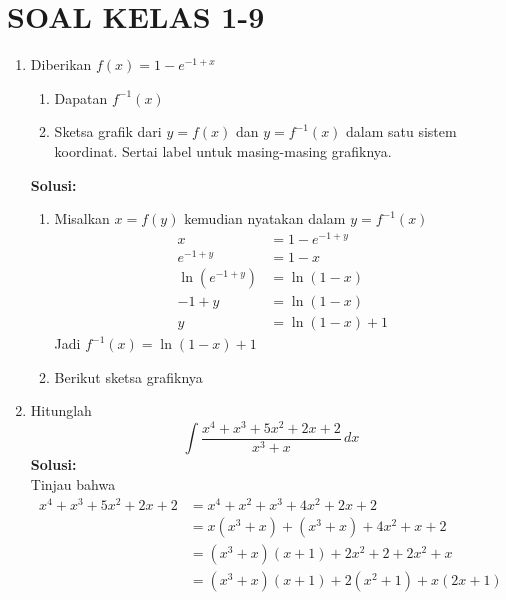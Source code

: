 \documentclass{article}
\begin{document}
\section*{SOAL KELAS 1-9}
\begin{enumerate}
	\item Diberikan $f(x)=1-e^{-1+x}$
	\begin{enumerate}
		\item Dapatan $f^{-1}(x)$
		\item Sketsa grafik dari $y=f(x)$ dan $y=f^{-1}(x)$ dalam satu sistem koordinat. Sertai label untuk masing-masing grafiknya.
	\end{enumerate}
	\textbf{Solusi:}
	\begin{enumerate}
		\item Misalkan $x=f(y)$ kemudian nyatakan dalam $y=f^{-1}(x)$
		\begin{align*}
		x &= 1-e^{-1+y}\\
		e^{-1+y} &= 1-x\\
		\ln (e^{-1+y}) &= \ln(1-x)\\
		-1+y &=\ln(1-x)\\
		y &= \ln(1-x)+1
		\end{align*}
		Jadi $f^{-1}(x)=\ln(1-x)+1$
		\item Berikut sketsa grafiknya
		\begin{center}
		\end{center}
	\end{enumerate}
	\item Hitunglah $$ \int \dfrac{x^4+x^3+5x^2+2x+2}{x^3+x} \, dx $$
	\textbf{Solusi:}\\
	Tinjau bahwa 
	\begin{align*}
	x^4+x^3+5x^2+2x+2 &= x^4+x^2+x^3+4x^2+2x+2\\
	&= x(x^3+x)+(x^3+x)+4x^2+x+2\\
	&= (x^3+x)(x+1)+2x^2+2+2x^2+x\\
	&= (x^3+x)(x+1)+2(x^2+1)+x(2x+1)
	\end{align*}

\end{enumerate}
\end{document}
